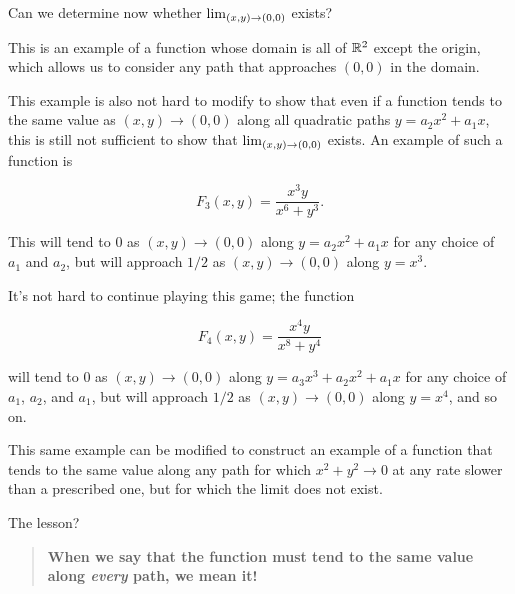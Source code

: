 \documentclass{ximera}
\begin{document}
\begin{exercise}
\begin{exercise}
Can we determine now whether $\lim_{\left(x,y\right) \to \left(0,0\right)}$ exists?
 
\begin{multipleChoice}
\end{multipleChoice}

\begin{remark}
This is an example of a function whose domain is all of $\mathbb R^2$ except the origin, which allows us to consider any path that approaches $(0,0)$ in the domain.

This example is also not hard to modify to show that even if a function tends to the same value as $(x,y) \to (0,0)$ along all quadratic paths $y=a_2x^2+a_1x$, this is still not sufficient to show that  $\lim_{\left(x,y\right) \to \left(0,0\right)}$ exists.  An example of such a function is 

\[
F_3(x,y) = \frac{x^3y}{x^6+y^3}.
\]

This will tend to $0$ as $(x,y) \to (0,0)$ along $y=a_2x^2+a_1x$ for any choice of $a_1$ and $a_2$, but will approach $1/2$ as $(x,y) \to (0,0)$ along $y=x^3$.

It's not hard to continue playing this game; the function

\[
F_4(x,y) = \frac{x^4y}{x^8+y^4}
\]

will tend to $0$ as $(x,y) \to (0,0)$ along $y=a_3x^3+a_2x^2+a_1x$ for any choice of $a_1$, $a_2$, and $a_1$, but will approach $1/2$ as $(x,y) \to (0,0)$ along $y=x^4$, and so on.

This same example can be modified to construct an example of a function that tends to the same value along any path for which $x^2+y^2 \to 0$ at any rate slower than a prescribed one, but for which the limit does not exist.

The lesson?

\begin{quote}
\textbf{When we say that the function must tend to the same value along \emph{every} path, we mean it!}
\end{quote}
\end{remark}

 \end{exercise}
 \end{exercise}
\end{document}
